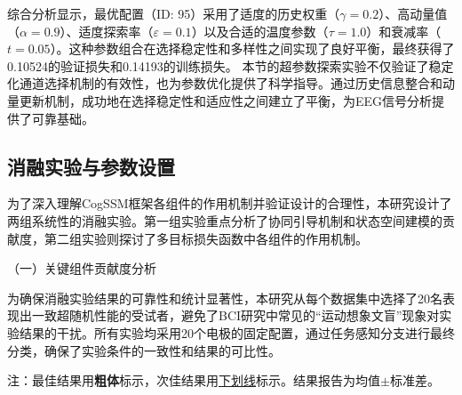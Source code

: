 综合分析显示，最优配置（ID: 95）采用了适度的历史权重（$\gamma=0.2$）、高动量值（$\alpha=0.9$）、适度探索率（$\varepsilon=0.1$）以及合适的温度参数（$\tau=1.0$）和衰减率（$t=0.05$）。这种参数组合在选择稳定性和多样性之间实现了良好平衡，最终获得了0.10524的验证损失和0.14193的训练损失。
本节的超参数探索实验不仅验证了稳定化通道选择机制的有效性，也为参数优化提供了科学指导。通过历史信息整合和动量更新机制，成功地在选择稳定性和适应性之间建立了平衡，为EEG信号分析提供了可靠基础。

\subsection{消融实验与参数设置}
\label{subsec:ablation_analysis}

为了深入理解CogSSM框架各组件的作用机制并验证设计的合理性，本研究设计了两组系统性的消融实验。第一组实验重点分析了协同引导机制和状态空间建模的贡献度，第二组实验则探讨了多目标损失函数中各组件的作用机制。

（一）关键组件贡献度分析

为确保消融实验结果的可靠性和统计显著性，本研究从每个数据集中选择了20名表现出一致超随机性能的受试者，避免了BCI研究中常见的“运动想象文盲”现象对实验结果的干扰。所有实验均采用20个电极的固定配置，通过任务感知分支进行最终分类，确保了实验条件的一致性和结果的可比性。

\begin{table}[htbp]
\centering
\caption{非BCI盲受试者的组件消融研究}
\label{tab:C4-5}
\begin{tablenotes}
\footnotesize
\item[]\centering 注：最佳结果用\textbf{粗体}标示，次佳结果用\underline{下划线}标示。结果报告为均值$\pm$标准差。
\end{tablenotes}
\end{table}

